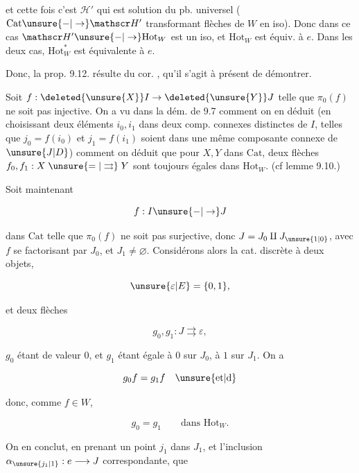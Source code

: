 
et cette fois c'est $\mathscr H'$ qui est solution du pb.
universel ($\mathrm{Cat}\unsure{-|\to}\mathscr H'$ transformant flèches de
$W$ en iso). Donc dans ce cas $\mathscr H'\unsure{-|\to}\mathrm{Hot}_{W}$ est
un iso, et $\mathrm{Hot}_{W}$ est équiv. à $e$. Dans les
deux cas, $\mathrm{Hot}_{W}^{*}$ est équivalente à $e$.

Donc, la prop. 9.12. résulte du cor. , qu'il
s'agit à présent de démontrer.

Soit $f:\deleted{\unsure{X}}I\to\deleted{\unsure{Y}}J$  telle que $\pi_0(f)$ ne soit pas injective.
On a vu dans la dém. de 9.7 comment on en
déduit (en choisissant deux éléments $i_0,i_1$ dans deux
comp. connexes distinctes de $I$, telles que
 $j_0=f(i_0)$ et $j_1=f(i_1)$  soient dans une même
composante connexe de $\unsure{J|D}$) comment on déduit
que pour $X,Y$ dans $\mathrm{Cat}$, deux flèches $f_0,f_1:X\mathrel{\unsure{=|\rightrightarrows}}Y$
sont toujours égales dans  $\mathrm{Hot}_{W}$. (cf lemme 9.10.)

Soit maintenant

\[
 f:I\unsure{-|\to}J
\]

dans $\mathrm{Cat}$ telle que $\pi_0(f)$ ne soit pas surjective,
donc $J=J_0\amalg J_{\unsure{1|0}}$, avec $f$ se factorisant par
$J_0$, et $J_1\ne\varnothing$. Considérons alors la cat. discrète
à deux objets,

\[
 \unsure{\varepsilon|E}=\{0,1\},
\]

et deux  flèches

\[
 g_0,g_1:J\rightrightarrows\varepsilon,
\]

$g_0$ étant  de valeur $0$, et $g_1$ étant
égale à $0$ sur $J_0$, à $1$ sur $J_1$. On a

\[
 g_0f=g_1f\quad\text{\unsure{et|d}}
\]

donc, comme $f\in W$,

\[
 g_0=g_1\qquad\text{dans }\mathrm{Hot}_{W}.
\]

On en conclut, en prenant un point $j_1$ dans $J_1$,
et l'inclusion $\alpha_{\unsure{j_1|1}}:e\longrightarrow J$ correspondante, que
